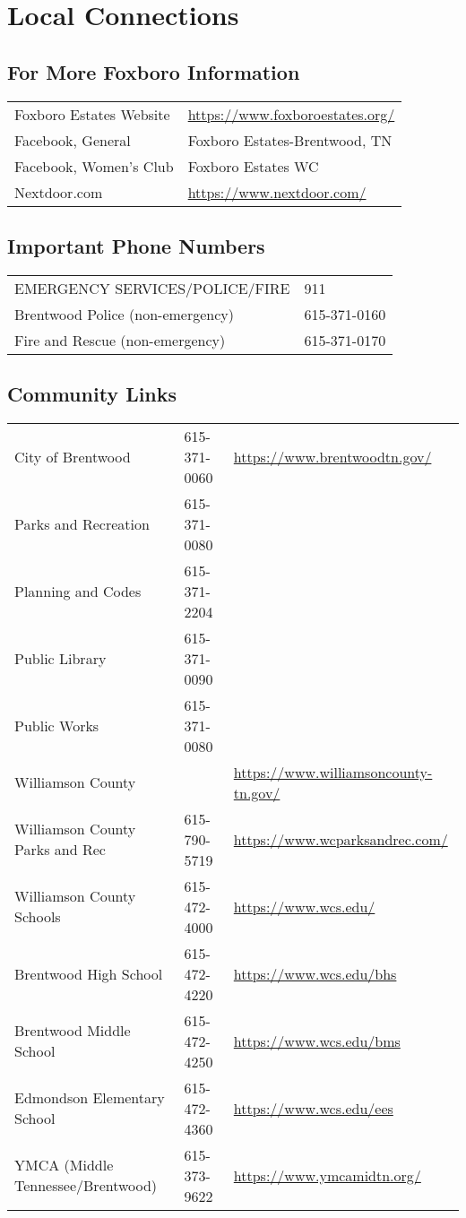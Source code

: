 \section{Local Connections}

\subsection{For More Foxboro Information}

\begin{tabular}{ll}  
Foxboro Estates Website & \url{https://www.foxboroestates.org/} \\
Facebook, General & Foxboro Estates-Brentwood, TN \\
Facebook, Women’s Club & Foxboro Estates WC \\
Nextdoor.com & \url{https://www.nextdoor.com/} \\
\end{tabular}


\subsection{Important Phone Numbers}
\begin{tabular}{ll}  
EMERGENCY SERVICES/POLICE/FIRE & 911 \\
Brentwood Police (non-emergency) & 615-371-0160 \\
Fire and Rescue (non-emergency) & 615-371-0170 \\
\end{tabular}

\subsection{Community Links}

\begin{tabular}{lll}
	City of Brentwood & 615-371-0060 & \url{https://www.brentwoodtn.gov/} \\
	Parks and Recreation & 615-371-0080 & \\
	Planning and Codes & 615-371-2204 & \\
	Public Library & 615-371-0090 & \\
	Public Works & 615-371-0080 & \\
	Williamson County & & \url{https://www.williamsoncounty-tn.gov/} \\
	Williamson County Parks and Rec & 615-790-5719 & \url{https://www.wcparksandrec.com/} \\
	Williamson County Schools & 615-472-4000 & \url{https://www.wcs.edu/} \\
	Brentwood High School & 615-472-4220 & \url{https://www.wcs.edu/bhs} \\
	Brentwood Middle School & 615-472-4250 & \url{https://www.wcs.edu/bms} \\
	Edmondson Elementary School & 615-472-4360 & \url{https://www.wcs.edu/ees} \\
	YMCA (Middle Tennessee/Brentwood) & 615-373-9622 & \url{https://www.ymcamidtn.org/} \\
\end{tabular}
			
